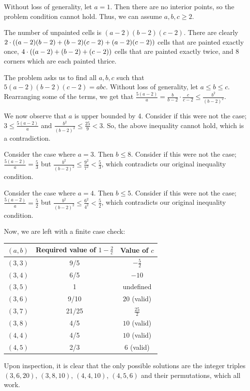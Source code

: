 \documentclass[10pt]{../usamts}
\begin{document}
\begin{solution}

Without loss of generality, let $a=1$. Then there are no interior points, so the problem condition cannot hold. Thus, we can assume $a,b,c \geq 2$.

The number of unpainted cells is $(a-2)(b-2)(c-2)$. There are clearly $2 \cdot \left( (a-2)(b-2)+(b-2)(c-2)+(a-2)(c-2) \right)$ cells that are painted exactly once, $4 \cdot \left( (a-2)+(b-2)+(c-2) \right)$ cells that are painted exactly twice, and $8$ corners which are each painted thrice.

The problem asks us to find all $a,b,c$ such that $5(a-2)(b-2)(c-2) = abc$. Without loss of generality, let $a \le b \le c$.
Rearranging some of the terms, we get that $\frac{5(a-2)}{a} = \frac{b}{b-2} \cdot \frac{c}{c-2} \le \frac{b^2}{(b-2)^2}$.

We now observe that $a$ is upper bounded by 4. Consider if this were not the case; $3 \le \frac{5(a-2)}{a}$ and $\frac{b^2}{(b-2)^2} \le \frac{25}{9} < 3$. So, the above inequality cannot hold, which is a contradiction.

Consider the case where $a=3$. Then $b \leq 8$. Consider if this were not the case; $\frac{5(a-2)}{a} = \frac{5}{3}$ but $\frac{b^2}{(b-2)^2} \leq \frac{9^2}{7^2} < \frac{5}{3}$, which contradicts our original inequality condition.

Consider the case where $a=4$. Then $b \leq 5$. Consider if this were not the case; $\frac{5(a-2)}{a} = \frac{5}{2}$ but $\frac{b^2}{(b-2)^2} \leq \frac{6^2}{4^2} < \frac{5}{2}$, which contradicts our original inequality condition.

Now, we are left with a finite case check:

\begin{center}
\begin{tabular}{c | c | c}
    $(a,b)$ & Required value of $1-\frac{2}{c}$ & Value of $c$\\\hline
    $(3,3)$ & 9/5 & $-\frac{5}{2}$ \\
    $(3,4)$ & 6/5 & $-10$ \\
    $(3,5)$ & 1 & undefined \\
    $(3,6)$ & 9/10 & $20$ (valid) \\
    $(3,7)$ & 21/25 & $\frac{25}{2}$ \\
    $(3,8)$ & 4/5 & $10$ (valid) \\
    $(4,4)$ & 4/5 & $10$ (valid) \\
    $(4,5)$ & 2/3 & $6$ (valid) \\
\end{tabular}
\end{center}

Upon inspection, it is clear that the only possible solutions are the integer triples $(3,6,20)$, $(3,8,10)$, $(4,4,10)$, $(4,5,6)$ and their permutations, which all work.

\end{solution}
\end{document}

